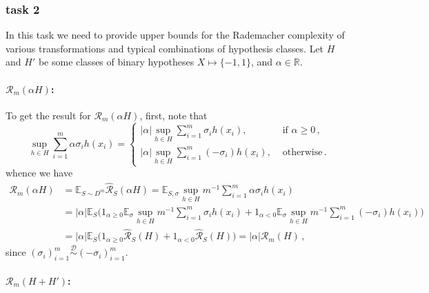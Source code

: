 \documentclass[a4paper]{article}
\newcommand{\Real}{\mathbb{R}}
\newcommand{\ex}{\mathbb{E}}
\begin{document}

\subsubsection{task 2} %
\label{ssub:task_2}

In this task we need to provide upper bounds for the Rademacher complexity of various
transformations and typical combinations of hypothesis classes. Let $H$ and $H'$
be some classes of binary hypotheses $X\mapsto\{-1, 1\}$, and $\alpha\in \Real$.

\paragraph{$\mathcal{R}_m(\alpha H)$:} %
\label{par:r_m_alpha_h}

To get the result for $\mathcal{R}_m(\alpha H)$, first, note that
\begin{equation}
  \sup_{h\in H} \sum_{i=1}^m \alpha \sigma_i h(x_i)
    =\begin{cases}
      |\alpha| \sup_{h\in H} \sum_{i=1}^m \sigma_i h(x_i), &\text{ if }\alpha \geq 0 \,,\\
      |\alpha| \sup_{h\in H} \sum_{i=1}^m (-\sigma_i) h(x_i), &\text{ otherwise}\,.
    \end{cases}
\end{equation}
whence we have
\begin{align*}
  \mathcal{R}_m(\alpha H)
    &= \ex_{S\sim D^m} \hat{\mathcal{R}}_S(\alpha H)
    = \ex_{S, \sigma} \sup_{h\in H} m^{-1} \sum_{i=1}^m \alpha \sigma_i h(x_i) \\
    &= |\alpha| \ex_S \bigl(
         1_{\alpha\geq 0} \ex_\sigma \sup_{h\in H} m^{-1} \sum_{i=1}^m \sigma_i h(x_i) 
       + 1_{\alpha < 0} \ex_\sigma \sup_{h\in H} m^{-1} \sum_{i=1}^m (-\sigma_i) h(x_i)
       \bigr)\\
    &= |\alpha| \ex_S \bigl(
         1_{\alpha\geq 0} \hat{\mathcal{R}}_S(H)
       + 1_{\alpha < 0} \hat{\mathcal{R}}_S(H)
       \bigr)
    = |\alpha| \mathcal{R}_m(H) \,,
\end{align*}
since $(\sigma_i)_{i=1}^m \overset{\mathcal{D}}{\sim} (-\sigma_i)_{i=1}^m$.


\paragraph{$\mathcal{R}_m(H+H')$:} %
\label{par:r_m_h_hh}
\end{document}
